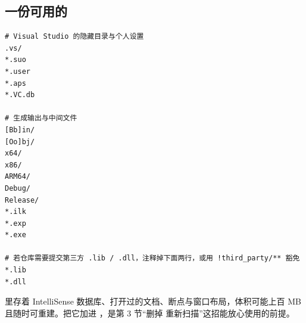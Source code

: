 \subsection{一份可用的 }
\begin{lstlisting}[style=textstyle]
# Visual Studio 的隐藏目录与个人设置
.vs/
*.suo
*.user
*.aps
*.VC.db

# 生成输出与中间文件
[Bb]in/
[Oo]bj/
x64/
x86/
ARM64/
Debug/
Release/
*.ilk
*.exp
*.exe

# 若仓库需要提交第三方 .lib / .dll，注释掉下面两行，或用 !third_party/** 豁免
*.lib
*.dll
\end{lstlisting}
\begin{tipbox}[提示]
 里存着 IntelliSense 数据库、打开过的文档、断点与窗口布局，体积可能上百 MB 且随时可重建。把它加进 ，是第 3 节“删掉  重新扫描”这招能放心使用的前提。
\end{tipbox}
